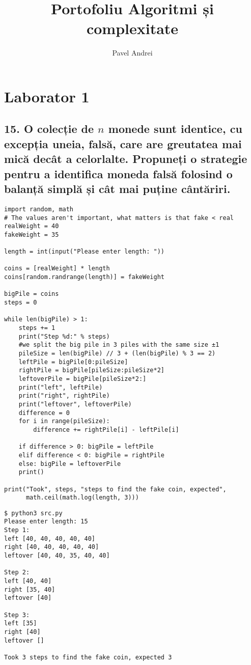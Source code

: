 \documentclass[11pt]{article}
\author{Pavel Andrei}
\date{}
\title{Portofoliu Algoritmi și complexitate}
\begin{document}
\maketitle

\section*{Laborator 1}
\label{sec:orgbe65cbd}
\subsection*{15. O colecție de \(n\) monede sunt identice, cu excepția uneia, falsă, care are greutatea mai mică decât a celorlalte. Propuneți o strategie pentru a identifica moneda falsă folosind o balanță simplă și cât mai puține cântăriri.}
\label{sec:org40329d3}

\begin{verbatim}
import random, math
# The values aren't important, what matters is that fake < real
realWeight = 40
fakeWeight = 35

length = int(input("Please enter length: "))

coins = [realWeight] * length
coins[random.randrange(length)] = fakeWeight

bigPile = coins
steps = 0

while len(bigPile) > 1:
    steps += 1
    print("Step %d:" % steps)
    #we split the big pile in 3 piles with the same size ±1
    pileSize = len(bigPile) // 3 + (len(bigPile) % 3 == 2)
    leftPile = bigPile[0:pileSize]
    rightPile = bigPile[pileSize:pileSize*2]
    leftoverPile = bigPile[pileSize*2:]
    print("left", leftPile)
    print("right", rightPile)
    print("leftover", leftoverPile)
    difference = 0
    for i in range(pileSize):
        difference += rightPile[i] - leftPile[i]

    if difference > 0: bigPile = leftPile
    elif difference < 0: bigPile = rightPile
    else: bigPile = leftoverPile
    print()

print("Took", steps, "steps to find the fake coin, expected", 
      math.ceil(math.log(length, 3)))
\end{verbatim}

\begin{verbatim}
$ python3 src.py
Please enter length: 15
Step 1:
left [40, 40, 40, 40, 40]
right [40, 40, 40, 40, 40]
leftover [40, 40, 35, 40, 40]

Step 2:
left [40, 40]
right [35, 40]
leftover [40]

Step 3:
left [35]
right [40]
leftover []

Took 3 steps to find the fake coin, expected 3
\end{verbatim}
\end{document}
